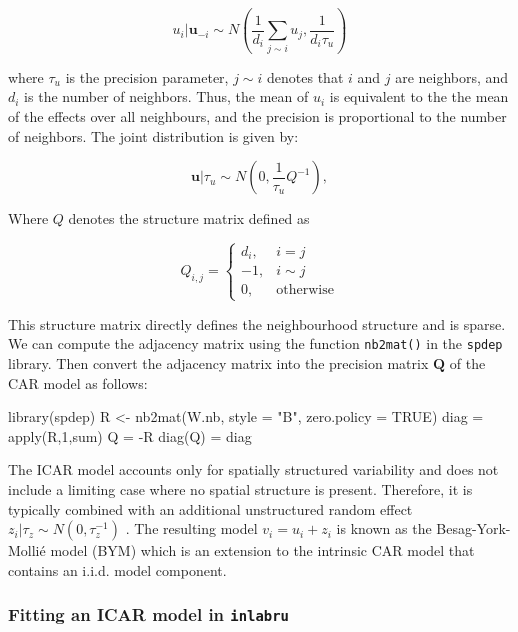 \documentclass[
  letterpaper,
  DIV=11,
  numbers=noendperiod]{scrartcl}
\newenvironment{Shaded}{\begin{snugshade}}{\end{snugshade}}
\newcommand{\AttributeTok}[1]{\textcolor[rgb]{0.40,0.45,0.13}{#1}}
\newcommand{\ConstantTok}[1]{\textcolor[rgb]{0.56,0.35,0.01}{#1}}
\newcommand{\DecValTok}[1]{\textcolor[rgb]{0.68,0.00,0.00}{#1}}
\newcommand{\FunctionTok}[1]{\textcolor[rgb]{0.28,0.35,0.67}{#1}}
\newcommand{\NormalTok}[1]{\textcolor[rgb]{0.00,0.23,0.31}{#1}}
\newcommand{\OtherTok}[1]{\textcolor[rgb]{0.00,0.23,0.31}{#1}}
\newcommand{\SpecialCharTok}[1]{\textcolor[rgb]{0.37,0.37,0.37}{#1}}
\newcommand{\StringTok}[1]{\textcolor[rgb]{0.13,0.47,0.30}{#1}}
\begin{document}
\[
u_i|\mathbf{u}_{-i} \sim N\left(\frac{1}{d_i}\sum_{j\sim i}u_j,\frac{1}{d_i\tau_u}\right)
\]

where \(\tau_u\) is the precision parameter, \(j\sim i\) denotes that
\(i\) and \(j\) are neighbors, and \(d_i\) is the number of neighbors.
Thus, the mean of \(u_i\) is equivalent to the the mean of the effects
over all neighbours, and the precision is proportional to the number of
neighbors. The joint distribution is given by:

\[
\mathbf{u}|\tau_u \sim N\left(0,\frac{1}{\tau_u}Q^{-1}\right),
\]

Where \(Q\) denotes the structure matrix defined as

\[
Q_{i,j} = \begin{cases}
d_i, & i = j \\
-1, & i \sim j \\
0, &\text{otherwise}
\end{cases}
\]

This structure matrix directly defines the neighbourhood structure and
is sparse. We can compute the adjacency matrix using the function
\texttt{nb2mat()} in the \texttt{spdep} library. Then convert the
adjacency matrix into the precision matrix \(\mathbf{Q}\) of the CAR
model as follows:

\begin{Shaded}
\begin{Highlighting}[]
\FunctionTok{library}\NormalTok{(spdep)}
\NormalTok{R }\OtherTok{\textless{}{-}} \FunctionTok{nb2mat}\NormalTok{(W.nb, }\AttributeTok{style =} \StringTok{"B"}\NormalTok{, }\AttributeTok{zero.policy =} \ConstantTok{TRUE}\NormalTok{)}
\NormalTok{diag }\OtherTok{=} \FunctionTok{apply}\NormalTok{(R,}\DecValTok{1}\NormalTok{,sum)}
\NormalTok{Q }\OtherTok{=} \SpecialCharTok{{-}}\NormalTok{R}
\FunctionTok{diag}\NormalTok{(Q) }\OtherTok{=}\NormalTok{ diag}
\end{Highlighting}
\end{Shaded}

The ICAR model accounts only for spatially structured variability and
does not include a limiting case where no spatial structure is present.
Therefore, it is typically combined with an additional unstructured
random effect \(z_i|\tau_z \sim N(0,\tau_{z}^{-1})\) . The resulting
model \(v_i = u_i + z_i\) is known as the Besag-York-Mollié model (BYM)
which is an extension to the intrinsic CAR model that contains an i.i.d.
model component.

\subsubsection{\texorpdfstring{Fitting an ICAR model in
\texttt{inlabru}}{Fitting an ICAR model in inlabru}}\label{fitting-an-icar-model-in-inlabru}
\end{document}
